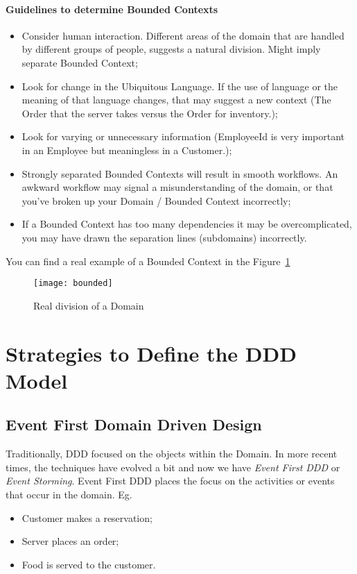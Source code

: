 \paragraph{Guidelines to determine Bounded Contexts}

\begin{itemize}
    \item Consider human interaction. Different areas of the domain that are handled by different groups of people, suggests a natural division. Might imply separate Bounded Context;
    \item Look for change in the Ubiquitous Language. If the use of language or the meaning of that language changes, that may suggest a new context (The Order that the server takes versus the Order for inventory.);
    \item Look for varying or unnecessary information (EmployeeId is very important in an Employee but meaningless in a Customer.);
    \item Strongly separated Bounded Contexts will result in smooth workflows. An awkward workflow may signal a misunderstanding of the domain, or that you've broken up your Domain / Bounded Context incorrectly;
    \item If a Bounded Context has too many dependencies it may be overcomplicated, you may have drawn the separation lines (subdomains) incorrectly.
\end{itemize}

You can find a real example of a Bounded Context in the Figure~\ref{fig:bounded}

\begin{figure}[ht]
\caption{Real division of a Domain}
\centering
\texttt{[image: bounded]}
 \label{fig:bounded}
\end{figure}

\section{Strategies to Define the DDD Model}

\subsection{Event First Domain Driven Design}

Traditionally, DDD focused on the objects within the Domain. In more recent times, the techniques have evolved a bit and now we have \emph{Event First DDD} or \emph{Event Storming}. Event First DDD places the focus on the activities or events that occur in the domain. Eg.
\begin{itemize}
    \item Customer makes a reservation;
    \item Server places an order;
    \item Food is served to the customer.
\end{itemize}


